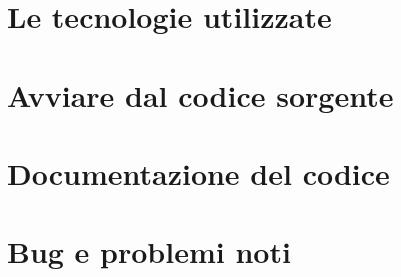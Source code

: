 \chapter{Le tecnologie utilizzate}


\chapter{Avviare dal codice sorgente}


\chapter{Documentazione del codice}


\chapter{Bug e problemi noti}
